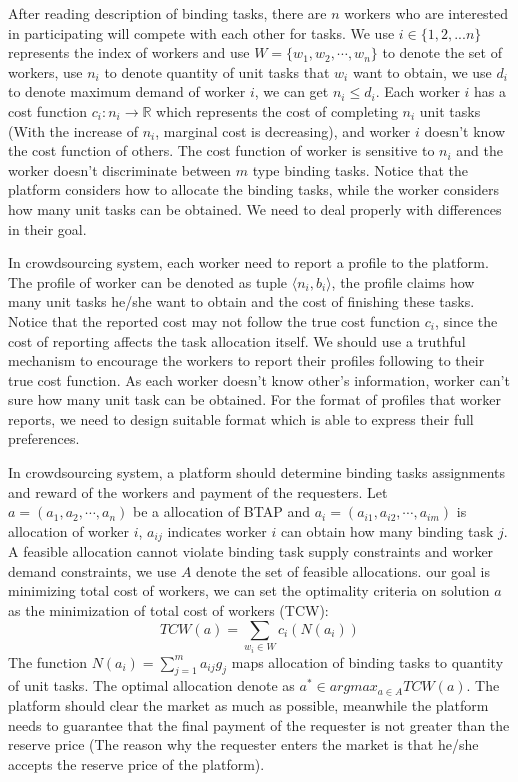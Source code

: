 After reading description of binding tasks, there are $n$ workers who are interested in participating will compete with each other for tasks. We use $i \in \{1,2,... n\}$ represents the index of workers and use $W = \{w_1,w_2,\cdots,w_n\}$ to denote the set of workers, use $n_i$ to denote quantity of unit tasks that $w_i$ want to obtain, we use $d_i$ to denote maximum demand of worker $i$, we can get $n_i \leq d_i$. Each worker $i$ has a cost function $c_i:n_i \rightarrow \mathbb{R} $ which represents the cost of completing $n_i$ unit tasks (With the increase of $n_i$, marginal cost is decreasing), and worker $i$ doesn't know the cost function of others. The cost function of worker is sensitive to $n_i$ and the worker doesn't discriminate between $m$ type binding tasks. Notice that the platform considers how to allocate the binding tasks, while the worker considers how many unit tasks can be obtained. We need to deal properly with differences in their goal.

In crowdsourcing system, each worker need to report a profile to the platform. The profile of worker can be denoted as tuple $\langle n_i,b_i \rangle$, the profile claims how many unit tasks he/she want to obtain and the cost of finishing these tasks. Notice that the reported cost may not follow the true cost function $c_i$, since the cost of reporting affects the task allocation itself. We should use a truthful mechanism to encourage the workers to report their profiles following to their true cost function. As each worker doesn't know other's information, worker can't sure how many unit task can be obtained. For the format of profiles that worker reports, we need to design suitable format which is able to express their full preferences.

In crowdsourcing system, a platform should determine binding tasks assignments and reward of the workers and payment of the requesters. Let $a=(a_1,a_2,\cdots,a_n)$ be a allocation of BTAP and $a_i = (a_{i1},a_{i2},\cdots,a_{im})$ is allocation of worker $i$, $a_{ij}$ indicates worker $i$ can obtain how many binding task $j$. A feasible allocation cannot violate binding task supply constraints and worker demand constraints, we use $A$ denote the set of feasible allocations. our goal is minimizing total cost of workers, we can set the optimality criteria on solution $a$ as the minimization of total cost of workers (TCW):
\begin{equation}\label{eq1}
  TCW(a) = \sum_{w_i \in W} c_i\left(N(a_i)\right)
\end{equation}
The function $N(a_i)=\sum_{j=1}^{m}a_{ij}g_j$ maps allocation of binding tasks to quantity of unit tasks. The optimal allocation denote as $a^{\ast} \in argmax_{a \in A} TCW(a)$. The platform should clear the market as much as possible, meanwhile the platform needs to guarantee that the final payment of the requester is not greater than the reserve price (The reason why the requester enters the market is that he/she accepts the reserve price of the platform).

